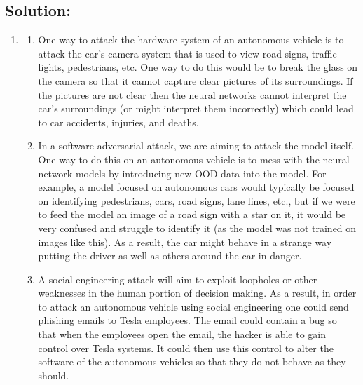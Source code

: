 \documentclass[submit]{harvardml}
\begin{document}
\newpage

\subsection*{Solution:}
\begin{enumerate}
    \item 
    \begin{enumerate}
        \item One way to attack the hardware system of an autonomous vehicle is to attack the car's camera system that is used to view road signs, traffic lights, pedestrians, etc. One way to do this would be to break the glass on the camera so that it cannot capture clear pictures of its surroundings. If the pictures are not clear then the neural networks cannot interpret the car's surroundings (or might interpret them incorrectly) which could lead to car accidents, injuries, and deaths.\\
        \item In a software adversarial attack, we are aiming to attack the model itself. One way to do this on an autonomous vehicle is to mess with the neural network models by introducing new OOD data into the model. For example, a model focused on autonomous cars would typically be focused on identifying pedestrians, cars, road signs, lane lines, etc., but if we were to feed the model an image of a road sign with a star on it, it would be very confused and struggle to identify it (as the model was not trained on images like this). As a result, the car might behave in a strange way putting the driver as well as others around the car in danger.\\
        \item A social engineering attack will aim to exploit loopholes or other weaknesses in the human portion of decision making. As a result, in order to attack an autonomous vehicle using social engineering one could send phishing emails to Tesla employees. The email could contain a bug so that when the employees open the email, the hacker is able to gain control over Tesla systems. It could then use this control to alter the software of the autonomous vehicles so that they do not behave as they should.\\

\end{enumerate}
\end{enumerate}
\end{document}
